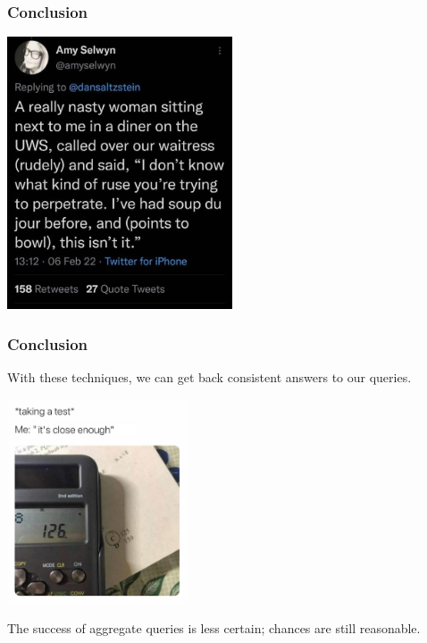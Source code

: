 \begin{frame}
\frametitle{Conclusion}

\begin{center}
	\includegraphics[width=0.5\textwidth]{images/soupdujour.jpg}
\end{center}
\end{frame}




\begin{frame}
\frametitle{Conclusion}

With these techniques, we can get back consistent answers to our queries. 



\begin{center}
	\includegraphics[width=0.4\textwidth]{images/close-enough.jpg}
\end{center}

The success of aggregate queries is less certain; chances are still reasonable.

\end{frame}








